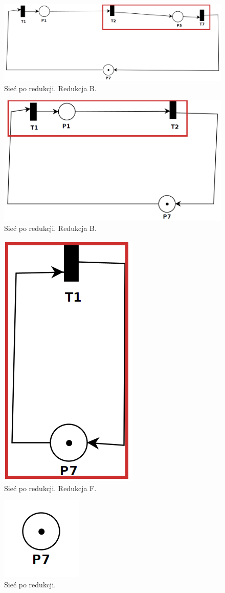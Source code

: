 \documentclass[12pt]{article}
\begin{document}
\begin{figure}[H]
    \centering
    \includegraphics[width=\linewidth]{../../lab8/ex_2_7}
    \caption{Sieć po redukcji. Redukcja B.}
\end{figure}


\begin{figure}[H]
    \centering
    \includegraphics[width=\linewidth]{../../lab8/ex_2_8}
    \caption{Sieć po redukcji. Redukcja B.}
\end{figure}

\begin{figure}[H]
    \centering
    \includegraphics[width=0.2\linewidth]{../../lab8/ex_2_9}
    \caption{Sieć po redukcji. Redukcja F.}
\end{figure}

\begin{figure}[H]
    \centering
    \includegraphics[width=0.2\linewidth]{../../lab8/ex_2_10}
    \caption{Sieć po redukcji.}
\end{figure}
\end{document}
